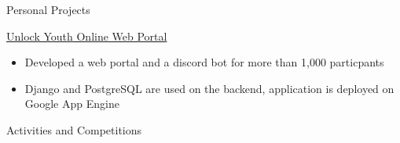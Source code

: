 \documentclass{article}
\newlength{\tabin}
\newlength{\secsep}
\newcommand{\lineunder}{\vspace*{-8pt} \\ \hspace*{-6pt} \hrulefill \\ \vspace*{-15pt}}
\newenvironment{tabbedsection}[1]{
  \begin{list}{}{
      \setlength{\itemsep}{0pt}
      \setlength{\labelsep}{0pt}
      \setlength{\labelwidth}{0pt}
      \setlength{\leftmargin}{\tabin}
      \setlength{\rightmargin}{\tabin}
      \setlength{\listparindent}{0pt}
      \setlength{\parsep}{0pt}
      \setlength{\parskip}{0pt}
      \setlength{\partopsep}{0pt}
      \setlength{\topsep}{#1}
    }
  \item[]
}{\end{list}}
\newenvironment{resume_section}[1]{
  \filbreak
  \vspace{2\secsep}
  \textsc{\large#1}
  \lineunder
  \begin{tabbedsection}{\secsep}
}{\end{tabbedsection}}
\newenvironment{resume_subsection}[2][]{
  \textbf{#2} \hfill {\footnotesize #1} \hspace{2em}
  \begin{tabbedsection}{0.5\secsep}
}{\end{tabbedsection}}
\newenvironment{subitems}{
  \renewcommand{\labelitemi}{-}
  \begin{itemize}
      \setlength{\labelsep}{1em}
}{\end{itemize}}
\begin{document}
\begin{resume_section}{Personal Projects}
  \begin{resume_subsection}{\href{https://github.com/marcustut/UnlockProject}{Unlock Youth Online Web Portal}}
    \begin{subitems}
      \item Developed a web portal and a discord bot for more than 1,000 particpants
      \item Django and PostgreSQL are used on the backend, application is deployed on Google App Engine
    \end{subitems}
  \end{resume_subsection}
\end{resume_section}

\begin{resume_section}{Activities and Competitions}




\end{resume_section}
\end{document}
